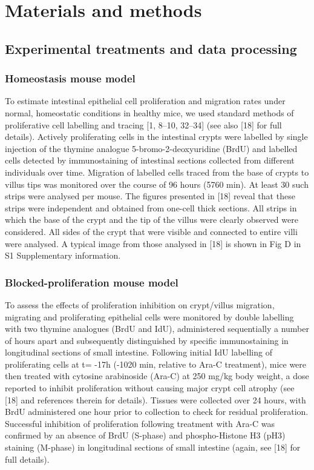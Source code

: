 \documentclass[10pt,letterpaper]{article}
\begin{document}
\section{Materials and methods}\label{materials-and-methods}
\subsection{Experimental treatments and data processing}\label{materials-and-methods-i-exp}

\subsubsection{Homeostasis mouse model}\label{homeostasis-mouse-model}

To estimate intestinal epithelial cell proliferation and migration rates
under normal, homeostatic conditions in healthy mice, we used standard
methods of proliferative cell labelling and tracing {[}1, 8--10,
32--34{]} (see also {[}18{]} for full details). Actively proliferating
cells in the intestinal crypts were labelled by single injection of the
thymine analogue 5-bromo-2-deoxyuridine (BrdU) and labelled cells
detected by immunostaining of intestinal sections collected from
different individuals over time. Migration of labelled cells traced from
the base of crypts to villus tips was monitored over the course of 96
hours (5760 min). At least 30 such strips were analysed per mouse. The
figures presented in {[}18{]} reveal that these strips were independent
and obtained from one-cell thick sections. All strips in which the base
of the crypt and the tip of the villus were clearly observed were
considered. All sides of the crypt that were visible and connected to
entire villi were analysed. A typical image from those analysed in
{[}18{]} is shown in Fig D in S1 Supplementary information.

\subsubsection{Blocked-proliferation mouse
model}\label{blocked-proliferation-mouse-model}

To assess the effects of proliferation inhibition on crypt/villus
migration, migrating and proliferating epithelial cells were monitored
by double labelling with two thymine analogues (BrdU and IdU),
administered sequentially a number of hours apart and subsequently
distinguished by specific immunostaining in longitudinal sections of
small intestine. Following initial IdU labelling of proliferating cells
at t= -17h (-1020 min, relative to Ara-C treatment), mice were then
treated with cytosine arabinoside (Ara-C) at 250 mg/kg body weight, a
dose reported to inhibit proliferation without causing major crypt cell
atrophy (see {[}18{]} and references therein for details). Tissues were
collected over 24 hours, with BrdU administered one hour prior to
collection to check for residual proliferation. Successful inhibition of
proliferation following treatment with Ara-C was confirmed by an absence
of BrdU (S-phase) and phospho-Histone H3 (pH3) staining (M-phase) in
longitudinal sections of small intestine (again, see {[}18{]} for full
details).
\end{document}
